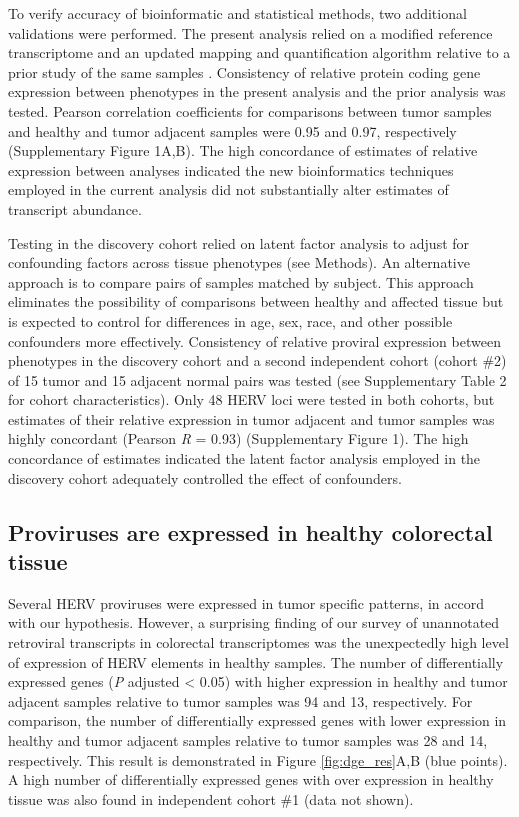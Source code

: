 To verify accuracy of bioinformatic and statistical methods, two additional validations were performed.
The present analysis relied on a modified reference transcriptome and an updated mapping and quantification algorithm relative to a prior study of the same samples \citep{Dampier2020}.
Consistency of relative protein coding gene expression between phenotypes in the present analysis and the prior analysis was tested.
Pearson correlation coefficients for comparisons between tumor samples and healthy and tumor adjacent samples were 0.95 and 0.97, respectively (Supplementary Figure 1A,B).
The high concordance of estimates of relative expression between analyses indicated the new bioinformatics techniques employed in the current analysis did not substantially alter estimates of transcript abundance.

Testing in the discovery cohort relied on latent factor analysis to adjust for confounding factors across tissue phenotypes (see Methods).
An alternative approach is to compare pairs of samples matched by subject.
This approach eliminates the possibility of comparisons between healthy and affected tissue but is expected to control for differences in age, sex, race, and other possible confounders more effectively.
Consistency of relative proviral expression between phenotypes in the discovery cohort and a second independent cohort (cohort \#2) of 15 tumor and 15 adjacent normal pairs was tested (see Supplementary Table 2 for cohort characteristics).
Only 48 HERV loci were tested in both cohorts, but estimates of their relative expression in tumor adjacent and tumor samples was highly concordant (Pearson \emph{R} = 0.93) (Supplementary Figure 1).
The high concordance of estimates indicated the latent factor analysis employed in the discovery cohort adequately controlled the effect of confounders.


\subsection*{Proviruses are expressed in healthy colorectal tissue}
Several HERV proviruses were expressed in tumor specific patterns, in accord with our hypothesis.
However, a surprising finding of our survey of unannotated retroviral transcripts in colorectal transcriptomes was the unexpectedly high level of expression of HERV elements in healthy samples.
The number of differentially expressed genes (\emph{P} adjusted < 0.05) with higher expression in healthy and tumor adjacent samples relative to tumor samples was 94 and 13, respectively.
For comparison, the number of differentially expressed genes with lower expression in healthy and tumor adjacent samples relative to tumor samples was 28 and 14, respectively.
This result is demonstrated in Figure \ref{fig:dge_res}A,B (blue points).
A high number of differentially expressed genes with over expression in healthy tissue was also found in independent cohort \#1 (data not shown).

